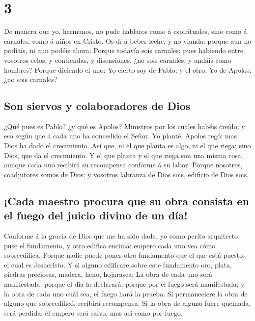 \hypertarget{section-2}{%
\section{3}\label{section-2}}

 De manera que yo, hermanos, no pude hablaros como á
espirituales, sino como á carnales, como á niños en Cristo. 
Os dí á beber leche, y no vianda: porque aun no podíais, ni aun podéis
ahora;  Porque todavía sois carnales: pues habiendo entre
vosotros celos, y contiendas, y disensiones, ¿no sois carnales, y andáis
como hombres?  Porque diciendo el uno: Yo cierto soy de
Pablo; y el otro: Yo de Apolos; ¿no sois carnales?

\hypertarget{son-siervos-y-colaboradores-de-dios}{%
\subsection{Son siervos y colaboradores de
Dios}\label{son-siervos-y-colaboradores-de-dios}}

 ¿Qué pues es Pablo? ¿y qué es Apolos? Ministros por los
cuales habéis creído; y eso según que á cada uno ha concedido el Señor.
 Yo planté, Apolos regó: mas Dios ha dado el crecimiento.
 Así que, ni el que planta es algo, ni el que riega; sino
Dios, que da el crecimiento.  Y el que planta y el que riega
son una misma cosa; aunque cada uno recibirá su recompensa conforme á su
labor.  Porque nosotros, coadjutores somos de Dios; y
vosotros labranza de Dios sois, edificio de Dios sois.

\hypertarget{cada-maestro-procura-que-su-obra-consista-en-el-fuego-del-juicio-divino-de-un-duxeda}{%
\subsection{¡Cada maestro procura que su obra consista en el fuego del
juicio divino de un
día!}\label{cada-maestro-procura-que-su-obra-consista-en-el-fuego-del-juicio-divino-de-un-duxeda}}

 Conforme á la gracia de Dios que me ha sido dada, yo como
perito arquitecto puse el fundamento, y otro edifica encima: empero cada
uno vea cómo sobreedifica.  Porque nadie puede poner otro
fundamento que el que está puesto, el cual es Jesucristo. 
Y si alguno edificare sobre este fundamento oro, plata, piedras
preciosas, madera, heno, hojarasca;  La obra de cada uno
será manifestada: porque el día la declarará; porque por el fuego será
manifestada; y la obra de cada uno cuál sea, el fuego hará la prueba.
 Si permaneciere la obra de alguno que sobreedificó,
recibirá recompensa.  Si la obra de alguno fuere quemada,
será perdida: él empero será salvo, mas así como por fuego.

